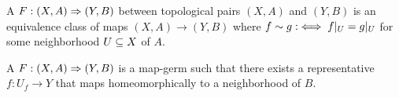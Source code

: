 \begin{mydefinition}
    A  $F: (X, A) \Rightarrow (Y, B)$ between topological pairs $(X, A)$ and $(Y, B)$ is an equivalence class of maps $(X, A) \to (Y, B)$
    where $f \sim g :\iff f\vert_{U} = g\vert_{U}$ for some neighborhood $U \subseteq{} X$ of $A$. 
\end{mydefinition}

\begin{myparagraph}
    A  $F: (X, A) \Rightarrow (Y, B)$ is a map-germ
    such that there exists a representative $f: U_f \to Y$ that maps homeomorphically to a neighborhood of $B$.  
\end{myparagraph}